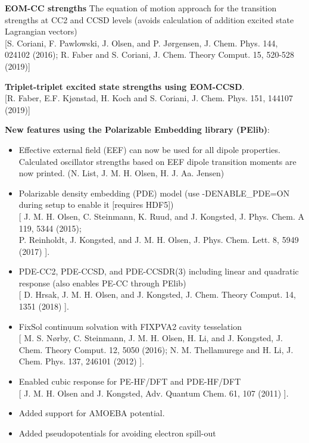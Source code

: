 \begin{description}
\item{\bf EOM-CC strengths} 
The equation of motion approach for the
transition strengths at CC2 and CCSD levels (avoids calculation of
addition excited state Lagrangian vectors) 
\\
{}
[S. Coriani, F. Pawlowski, J. Olsen, and P. J{\o}rgensen,
J. Chem. Phys. 144, 024102 (2016); 
R. Faber and S. Coriani, J. Chem. Theory Comput. 15, 520-528 (2019)]
\item{\bf Triplet-triplet excited state strengths 
using EOM-CCSD}. \\
{}
[R. Faber, E.F. Kj{\o}nstad, H. Koch and S. Coriani,
J. Chem. Phys. 151, 144107 (2019)]\\
\item{\bf New features using the Polarizable Embedding library (PElib)}:
 \begin{itemize}
  \item Effective external field (EEF) can now be used for all dipole properties. Calculated oscillator strengths based on EEF dipole transition moments are now printed. (N. List, J. M. H. Olsen, H. J. Aa. Jensen)
  \item Polarizable density embedding (PDE) model (use -DENABLE\_PDE=ON during setup to enable it [requires HDF5]) \\ {}
    [ J. M. H. Olsen, C. Steinmann, K. Ruud, and J. Kongsted, J. Phys. Chem. A 119, 5344 (2015); \\
      P. Reinholdt, J. Kongsted, and J. M. H. Olsen, J. Phys. Chem. Lett. 8, 5949 (2017) ].
  \item PDE-CC2, PDE-CCSD, and PDE-CCSDR(3) including linear and quadratic response (also enables PE-CC through PElib) \\ {}
    [ D. Hrsak, J. M. H. Olsen, and J. Kongsted, J. Chem. Theory Comput. 14, 1351 (2018) ].
  \item FixSol continuum solvation with FIXPVA2 cavity tesselation \\ {}
    [ M. S. Nørby, C. Steinmann, J. M. H. Olsen, H. Li, and J. Kongsted, J. Chem. Theory Comput. 12, 5050 (2016);
      N. M. Thellamurege and H. Li, J. Chem. Phys. 137, 246101 (2012) ].
  \item Enabled cubic response for PE-HF/DFT and PDE-HF/DFT \\ {}
    [ J. M. H. Olsen and J. Kongsted, Adv. Quantum Chem. 61, 107 (2011) ].
  \item Added support for AMOEBA potential.
  \item Added pseudopotentials for avoiding electron spill-out \\ {}

\end{itemize}
\end{description}
